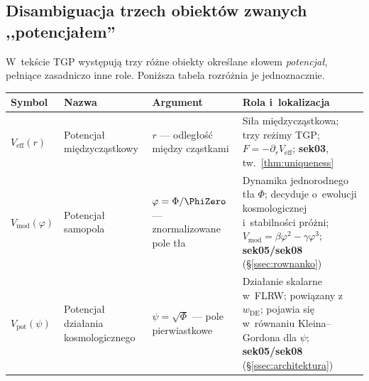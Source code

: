 \subsection*{Disambiguacja trzech obiekt\'ow zwanych ,,potencja\l{}em''}
\label{app:A-potential-disambiguation}

W~tek\'scie TGP wyst\k{e}puj\k{a} trzy r\'o\.zne obiekty okre\'slane
s\l{}owem \emph{potencja\l{}}, pe\l{}ni\k{a}ce zasadniczo inne role.
Poni\.zsza tabela rozr\'o\.znia je jednoznacznie.

\begin{center}
\small
\begin{tabular}{@{}p{2.6cm}p{2.6cm}p{3.0cm}p{4.8cm}@{}}
\toprule
\textbf{Symbol} & \textbf{Nazwa} & \textbf{Argument} & \textbf{Rola i~lokalizacja} \\
\midrule
$V_{\mathrm{eff}}(r)$
  & Potencja\l{} mi\k{e}dzycz\k{a}stkowy
  & $r$ --- odleg\l{}o\'s\'c mi\k{e}dzy cz\k{a}stkami
  & Si\l{}a mi\k{e}dzycz\k{a}stkowa; trzy re\.zimy TGP;
    $F = -\partial_r V_{\mathrm{eff}}$;
    \textbf{sek03}, tw.~\ref{thm:uniqueness} \\
\midrule
$V_{\mathrm{mod}}(\varphi)$
  & Potencja\l{} samopola
  & $\varphi = \Phi/\PhiZero$ --- znormalizowane pole t\l{}a
  & Dynamika jednorodnego t\l{}a $\Phi$; decyduje o~ewolucji
    kosmologicznej i~stabilno\'sci pr\'o\.zni;
    $V_{\mathrm{mod}} = \beta\varphi^2 - \gamma\varphi^3$;
    \textbf{sek05/sek08} (\S\ref{ssec:rownanko}) \\
\midrule
$V_{\mathrm{pot}}(\psi)$
  & Potencja\l{} dzia\l{}ania kosmologicznego
  & $\psi = \sqrt{\Phi}$ --- pole pierwiastkowe
  & Dzia\l{}anie skalarne w~FLRW; powi\k{a}zany z~$w_{\mathrm{DE}}$;
    pojawia si\k{e} w~r\'ownaniu Kleina--Gordona dla $\psi$;
    \textbf{sek05/sek08} (\S\ref{ssec:architektura}) \\
\bottomrule
\end{tabular}
\end{center}

